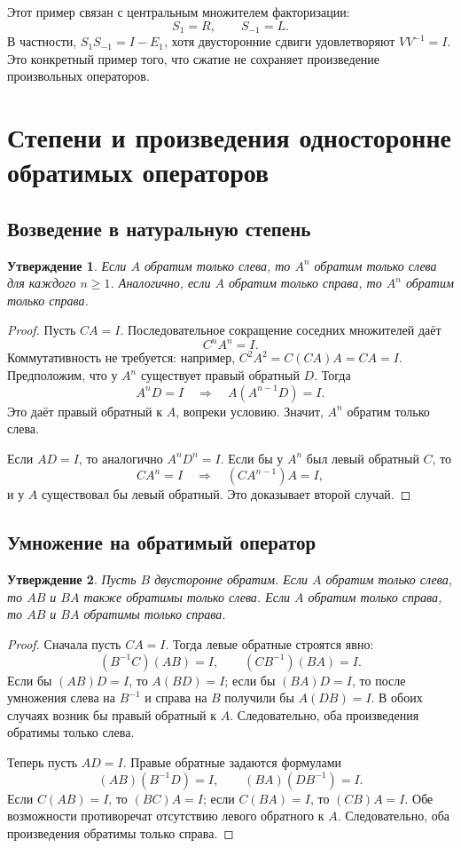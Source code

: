 \documentclass[12pt,a4paper]{article}
\newtheorem{proposition}{Утверждение}
\theoremstyle{definition}
\theoremstyle{remark}
\begin{document}
Этот пример связан с центральным множителем факторизации:
\[
  S_1=R,\qquad S_{-1}=L.
\]
В частности, $S_1S_{-1}=I-E_1$, хотя двусторонние сдвиги удовлетворяют
$VV^{-1}=I$. Это конкретный пример того, что сжатие не сохраняет
произведение произвольных операторов.

\section{Степени и произведения односторонне обратимых операторов}

\subsection{Возведение в натуральную степень}

\begin{proposition}
Если $A$ обратим только слева, то $A^n$ обратим только слева
для каждого $n\geqslant1$. Аналогично, если $A$ обратим только
справа, то $A^n$ обратим только справа.
\end{proposition}

\begin{proof}
Пусть $CA=I$. Последовательное сокращение соседних множителей даёт
\[
  C^nA^n=I.
\]
Коммутативность не требуется: например,
$C^2A^2=C(CA)A=CA=I$.
Предположим, что у $A^n$ существует правый обратный $D$.
Тогда
\[
  A^nD=I\quad\Longrightarrow\quad A(A^{n-1}D)=I.
\]
Это даёт правый обратный к $A$, вопреки условию. Значит,
$A^n$ обратим только слева.

Если $AD=I$, то аналогично $A^nD^n=I$. Если бы у $A^n$ был
левый обратный $C$, то
\[
  CA^n=I\quad\Longrightarrow\quad(CA^{n-1})A=I,
\]
и у $A$ существовал бы левый обратный. Это доказывает второй случай.
\end{proof}

\subsection{Умножение на обратимый оператор}

\begin{proposition}
Пусть $B$ двусторонне обратим. Если $A$ обратим только слева,
то $AB$ и $BA$ также обратимы только слева.
Если $A$ обратим только справа, то $AB$ и $BA$ обратимы только справа.
\end{proposition}

\begin{proof}
Сначала пусть $CA=I$. Тогда левые обратные строятся явно:
\[
  (B^{-1}C)(AB)=I,\qquad (CB^{-1})(BA)=I.
\]
Если бы $(AB)D=I$, то $A(BD)=I$; если бы $(BA)D=I$,
то после умножения слева на $B^{-1}$ и справа на $B$ получили бы
$A(DB)=I$. В обоих случаях возник бы правый обратный к $A$.
Следовательно, оба произведения обратимы только слева.

Теперь пусть $AD=I$. Правые обратные задаются формулами
\[
  (AB)(B^{-1}D)=I,\qquad (BA)(DB^{-1})=I.
\]
Если $C(AB)=I$, то $(BC)A=I$; если $C(BA)=I$, то $(CB)A=I$.
Обе возможности противоречат отсутствию левого обратного к $A$.
Следовательно, оба произведения обратимы только справа.
\end{proof}
\end{document}
